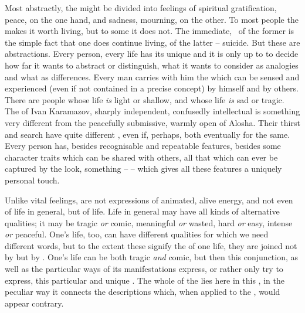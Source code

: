 \pa Most abstractly, the  might be divided into feelings of
spiritual gratification, peace, on the one
hand, and sadness, mourning, on the other.  To most people the  makes it worth living, but to some it does not. The immediate, \os\ of
the former is the simple fact that one does continue living, of the latter --
suicide.  But these are abstractions. Every person, every life has its unique
 and it is only up to  to decide how far it wants to
abstract or distinguish, what it wants to consider as analogies and what as
differences.  Every man carries with him the  which can
be sensed and experienced (even if not contained in a precise concept) by
himself and by others. There are people whose life {\em is} light or shallow,
and whose life {\em is} sad or tragic. The  of Ivan
Karamazov, sharply independent, confusedly intellectual is something very
different from the peacefully submissive, warmly open  of
Alosha. Their thirst and search have quite different , even if,
perhaps, both  eventually for the same.
Every person has, besides recognisable and repeatable features, besides some
character traits which can be shared with others,  all that which can
ever be captured by the  look, something --  --
which gives all these features a uniquely personal touch.  

Unlike vital feelings,  are not  expressions of
animated, alive energy, and not even of life in general, but of  life.
Life in general may have all kinds of alternative qualities; it may be tragic
{\em or} comic, meaningful {\em or} wasted, hard {\em or} easy, intense {\em or}
peaceful.  One's life, too, can have different qualities for which we need
different words, but to the extent these signify the  of one life,
they are joined not by  but by . One's life can be both
tragic {\em and} comic, but then this conjunction, as well as the particular
ways of its manifestations express, or rather only try to express, this 
particular and unique . The whole  of the
 lies here in this , in the peculiar way it
connects the descriptions which, when applied to the , would
appear contrary. 


